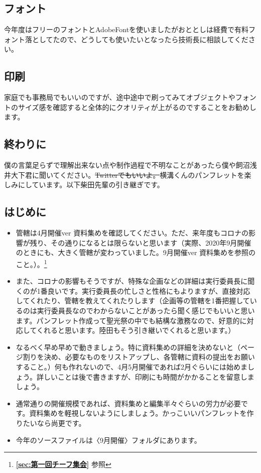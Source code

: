 \documentclass[dvipdfmx,jb5]{jarticle}
\begin{document}
\subsection{フォント}
今年度はフリーのフォントとAdobeFontを使いましたがおととしは経費で有料フォント落としてたので、どうしても使いたいとなったら技術長に相談してください。

\subsection{印刷}
家庭でも事務局でもいいのですが、途中途中で刷ってみてオブジェクトやフォントのサイズ感を確認すると全体的にクオリティが上がるのですることをお勧めします。

\subsection{終わりに}
僕の言葉足らずで理解出来ない点や制作過程で不明なことがあったら僕や飼沼浅井大下君に聞いてください。\sout{Twitterでもいいよ。}横溝くんのパンフレットを楽しみにしています。以下柴田先輩の引き継ぎです。

\subsection{はじめに}
 \begin{itemize}
\item 管轄は4月開催ver 資料集めを確認してください。ただ、来年度もコロナの影響が残り、その通りになるとは限らないと思います（実際、2020年9月開催のときにも、大きく管轄が変わっていました。9月開催ver 資料集めを参照のこと。）。\footnote{{\bf \ref{sec:第一回チーフ集会}} 参照}
\item また、コロナの影響もそうですが、特殊な企画などの詳細は実行委員長に聞くのが1番良いです。実行委員長の忙しさと性格にもよりますが、直接対応してくれたり、管轄を教えてくれたりします（企画等の管轄を1番把握しているのは実行委員長なのでわからないことがあったら聞く感じでもいいと思います。パンフレット作成って聖光祭の中でも結構な激務なので、好意的に対応してくれると思います。陸田もそう引き継いでくれると思います。）
\item なるべく早め早めで動きましょう。特に資料集めの詳細を決めないと（ページ割りを決め、必要なものをリストアップし、各管轄に資料の提出をお願いすること。）何も作れないので、4月5月開催であれば2月ぐらいには始めましょう。詳しいことは後で書きますが、印刷にも時間がかかることを留意しましょう。
\item 通常通りの開催規模であれば、資料集めと編集半々ぐらいの労力が必要です。資料集めを軽視しないようにしましょう。かっこいいパンフレットを作りたいなら尚更です。
\item 今年のソースファイルは〈9月開催〉フォルダにあります。
\end{itemize}
\end{document}
